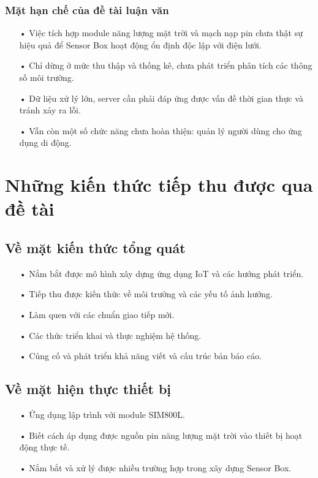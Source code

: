 \subsubsection*{Mặt hạn chế của đề tài luận văn}
\begin{itemize}
\item[•] Việc tích hợp module năng lượng mặt trời và mạch nạp pin chưa thật sự hiệu quả để Sensor Box hoạt động ổn định độc lập với điện lưới.
\item[•] Chỉ dừng ở mức thu thập và thống kê, chưa phát triển phân tích các thông số môi trường.
\item[•] Dữ liệu xử lý lớn, server cần phải đáp ứng được vấn đề thời gian thực và tránh xảy ra lỗi.
\item[•] Vẫn còn một số chức năng chưa hoàn thiện: quản lý người dùng cho ứng dụng di động.
\end{itemize}




\section{Những kiến thức tiếp thu được qua đề tài}
\subsection{Về mặt kiến thức tổng quát}
\begin{itemize}
	\item[•] Nắm bắt được mô hình xây dựng ứng dụng IoT và các hướng phát triển.
	\item[•] Tiếp thu được kiến thức về môi trường và các yếu tố ảnh hưởng.
	\item[•] Làm quen với các chuẩn giao tiếp mới.
	\item[•] Các thức triển khai và thực nghiệm hệ thống.
	\item[•] Củng cố và phát triển khả năng viết và cấu trúc bản báo cáo.
\end{itemize}
\subsection{Về mặt hiện thực thiết bị}
\begin{itemize}
	\item[•] Ứng dụng lập trình với module SIM800L.
	\item[•] Biết cách áp dụng được nguồn pin năng lượng mặt trời vào thiết bị hoạt động thực tế.
	\item[•] Nắm bắt và xử lý được nhiều trường hợp trong xây dựng Sensor Box.
\end{itemize}
